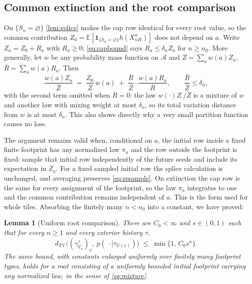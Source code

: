 \documentclass[11pt]{article}
\theoremstyle{plain}
\newtheorem{lemma}[theorem]{Lemma}
\theoremstyle{definition}
\theoremstyle{remark}
\newcommand{\A}{\mathcal{A}}
\newcommand{\E}{\mathbb{E}}
\newcommand{\dtv}{d_{\mathrm{TV}}}
\newcommand{\Ue}{\mathrm{U}}
\begin{document}
\subsection{Common extinction and the root comparison}
\label{sec:extinction}

On $\{S_n=\varnothing\}$ \cref{lem:splice} makes the cap row identical for every root value, so the common contribution $Z_0=\E[\mathbf 1_{\{S_n=\varnothing\}}h(X^a_{nH})]$ does not depend on $a$. Write $Z_a=Z_0+R_a$ with $R_a\ge0$; \eqref{eq:capbound} says $R_a\le\delta_nZ_a$ for $n\ge n_0$. More generally, let $w$ be any probability mass function on $\A$ and $\bar Z=\sum_aw(a)Z_a$, $\bar R=\sum_aw(a)R_a$. Then
\begin{equation}
\frac{w(a)Z_a}{\bar Z}\;=\;\frac{Z_0}{\bar Z}\,w(a)\;+\;\frac{\bar R}{\bar Z}\cdot\frac{w(a)R_a}{\bar R},\qquad \frac{\bar R}{\bar Z}\le\delta_n,
\label{eq:mixture}
\end{equation}
with the second term omitted when $\bar R=0$: the law $w(\cdot)Z_\cdot/\bar Z$ is a mixture of $w$ and another law with mixing weight at most $\delta_n$, so its total variation distance from $w$ is at most $\delta_n$. This also shows directly why a very small partition function causes no loss.

The argument remains valid when, conditional on $a$, the initial row inside a fixed finite footprint has any normalized law $\pi_a$ and the row outside the footprint is fixed: sample that initial row independently of the future seeds and include its expectation in $Z_a$. For a fixed sampled initial row the splice calculation is unchanged, and averaging preserves \eqref{eq:resample}. On extinction the cap row is the same for every assignment of the footprint, so the law $\pi_a$ integrates to one and the common contribution remains independent of $a$. This is the form used for whole tiles. Absorbing the finitely many $n<n_0$ into a constant, we have proved:

\begin{lemma}[Uniform root comparison]
\label{lem:root}
There are $C_0<\infty$ and $s\in(0,1)$ such that for every $n\ge1$ and every exterior history $\tau$,
\begin{equation}
\dtv\bigl((\gamma^\tau_{V_n})_v,\ p(\,\cdot\mid\tau_{\Ue(v)})\bigr)\;\le\;\min\{1,\,C_0s^n\}.
\label{eq:root}
\end{equation}
The same bound, with constants enlarged uniformly over finitely many footprint types, holds for a root consisting of a uniformly bounded initial footprint carrying any normalized law, in the sense of \eqref{eq:mixture}.
\end{lemma}
\end{document}
